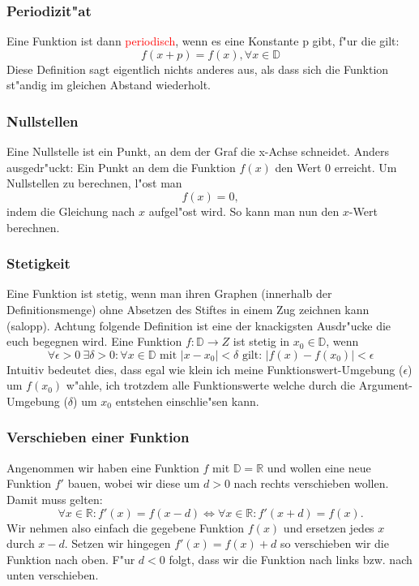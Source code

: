 \subsubsection{Periodizit"at}
Eine Funktion ist dann \textcolor{red}{periodisch}, wenn es eine Konstante p gibt, f"ur die gilt:
\begin{equation*}
f(x+p) = f(x), \forall x\in\mathbb{D}
\end{equation*}
Diese Definition sagt eigentlich nichts anderes aus, als dass sich die Funktion st"andig im gleichen Abstand wiederholt.

\subsubsection{Nullstellen} \label{sec:nullstellen}
Eine Nullstelle ist ein Punkt, an dem der Graf die x-Achse schneidet. Anders ausgedr"uckt: Ein Punkt an dem die Funktion $f(x)$ den Wert $0$ erreicht. Um Nullstellen zu berechnen, l"ost man
\begin{equation*}
f(x) = 0,
\end{equation*}
indem die Gleichung nach $x$ aufgel"ost wird. So kann man nun den $x$-Wert berechnen.

\subsubsection{Stetigkeit}
Eine Funktion ist stetig, wenn man ihren Graphen (innerhalb der Definitionsmenge) ohne Absetzen des Stiftes in einem Zug zeichnen kann (salopp). Achtung folgende Definition ist eine der knackigsten Ausdr"ucke die euch begegnen wird. Eine Funktion $f : \mathbb{D} \to Z$ ist stetig in $x_0 \in \mathbb{D}$, wenn
\begin{equation*}
\forall \epsilon > 0 \ \exists \delta > 0 : \forall x \in \mathbb{D} \text{ mit } \left|x - x_0 \right| < \delta \text{ gilt: } \left| f(x) - f(x_0) \right| < \epsilon 
\end{equation*}
Intuitiv bedeutet dies, dass egal wie klein ich meine Funktionswert-Umgebung ($\epsilon$) um $f(x_0)$ w"ahle, ich trotzdem alle Funktionswerte welche durch die Argument-Umgebung ($\delta$) um $x_0$ entstehen einschlie"sen kann.

\subsubsection{Verschieben einer Funktion} \label{sec:verschieben}
Angenommen wir haben eine Funktion $f$ mit $\mathbb{D} = \mathbb{R}$ und wollen eine neue Funktion $f'$ bauen, wobei wir diese um $d > 0$ nach rechts verschieben wollen. Damit muss gelten:
\begin{equation*}
\forall x \in \mathbb{R} :  f'(x) = f(x-d) \iff \forall x \in \mathbb{R} : f'(x+d) = f(x).
\end{equation*}
Wir nehmen also einfach die gegebene Funktion $f(x)$ und ersetzen jedes $x$ durch $x-d$. Setzen wir hingegen $f'(x) = f(x) + d$ so verschieben wir die Funktion nach oben. F"ur $d < 0$ folgt, dass wir die Funktion nach links bzw. nach unten verschieben.